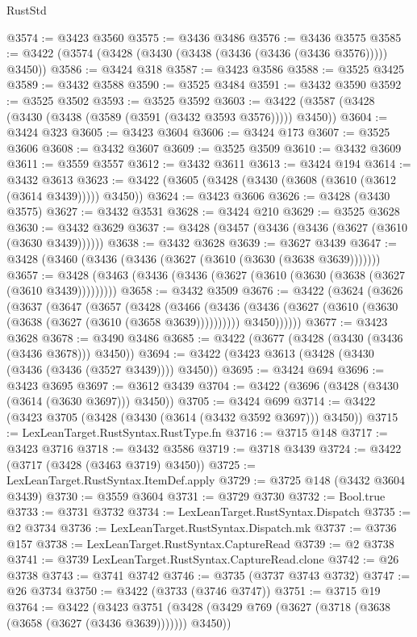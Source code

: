 \begin{lexlean}{RustStd}
\begin{coremodule}
@3574 := @3423 @3560
@3575 := @3436 @3486
@3576 := @3436 @3575
@3585 := @3422 (@3574 (@3428 (@3430 (@3438 (@3436 (@3436 (@3436 @3576))))) @3450))
@3586 := @3424 @318
@3587 := @3423 @3586
@3588 := @3525 @3425
@3589 := @3432 @3588
@3590 := @3525 @3484
@3591 := @3432 @3590
@3592 := @3525 @3502
@3593 := @3525 @3592
@3603 := @3422 (@3587 (@3428 (@3430 (@3438 (@3589 (@3591 (@3432 @3593 @3576))))) @3450))
@3604 := @3424 @323
@3605 := @3423 @3604
@3606 := @3424 @173
@3607 := @3525 @3606
@3608 := @3432 @3607
@3609 := @3525 @3509
@3610 := @3432 @3609
@3611 := @3559 @3557
@3612 := @3432 @3611
@3613 := @3424 @194
@3614 := @3432 @3613
@3623 := @3422 (@3605 (@3428 (@3430 (@3608 (@3610 (@3612 (@3614 @3439))))) @3450))
@3624 := @3423 @3606
@3626 := @3428 (@3430 @3575)
@3627 := @3432 @3531
@3628 := @3424 @210
@3629 := @3525 @3628
@3630 := @3432 @3629
@3637 := @3428 (@3457 (@3436 (@3436 (@3627 (@3610 (@3630 @3439))))))
@3638 := @3432 @3628
@3639 := @3627 @3439
@3647 := @3428 (@3460 (@3436 (@3436 (@3627 (@3610 (@3630 (@3638 @3639)))))))
@3657 := @3428 (@3463 (@3436 (@3436 (@3627 (@3610 (@3630 (@3638 (@3627 (@3610 @3439)))))))))
@3658 := @3432 @3509
@3676 := @3422
    (@3624
      (@3626
        (@3637
          (@3647
            (@3657
              (@3428
                (@3466
                  (@3436 (@3436 (@3627 (@3610 (@3630 (@3638 (@3627 (@3610 (@3658 @3639))))))))))
                @3450))))))
@3677 := @3423 @3628
@3678 := @3490 @3486
@3685 := @3422 (@3677 (@3428 (@3430 (@3436 (@3436 @3678))) @3450))
@3694 := @3422 (@3423 @3613 (@3428 (@3430 (@3436 (@3436 (@3527 @3439)))) @3450))
@3695 := @3424 @694
@3696 := @3423 @3695
@3697 := @3612 @3439
@3704 := @3422 (@3696 (@3428 (@3430 (@3614 (@3630 @3697))) @3450))
@3705 := @3424 @699
@3714 := @3422 (@3423 @3705 (@3428 (@3430 (@3614 (@3432 @3592 @3697))) @3450))
@3715 := LexLeanTarget.RustSyntax.RustType.fn
@3716 := @3715 @148
@3717 := @3423 @3716
@3718 := @3432 @3586
@3719 := @3718 @3439
@3724 := @3422 (@3717 (@3428 (@3463 @3719) @3450))
@3725 := LexLeanTarget.RustSyntax.ItemDef.apply
@3729 := @3725 @148 (@3432 @3604 @3439)
@3730 := @3559 @3604
@3731 := @3729 @3730
@3732 := Bool.true
@3733 := @3731 @3732
@3734 := LexLeanTarget.RustSyntax.Dispatch
@3735 := @2 @3734
@3736 := LexLeanTarget.RustSyntax.Dispatch.mk
@3737 := @3736 @157
@3738 := LexLeanTarget.RustSyntax.CaptureRead
@3739 := @2 @3738
@3741 := @3739 LexLeanTarget.RustSyntax.CaptureRead.clone
@3742 := @26 @3738
@3743 := @3741 @3742
@3746 := @3735 (@3737 @3743 @3732)
@3747 := @26 @3734
@3750 := @3422 (@3733 (@3746 @3747))
@3751 := @3715 @19
@3764 := @3422
    (@3423 @3751 (@3428 (@3429 @769 (@3627 (@3718 (@3638 (@3658 (@3627 (@3436 @3639))))))) @3450))

\end{coremodule}
\end{lexlean}
